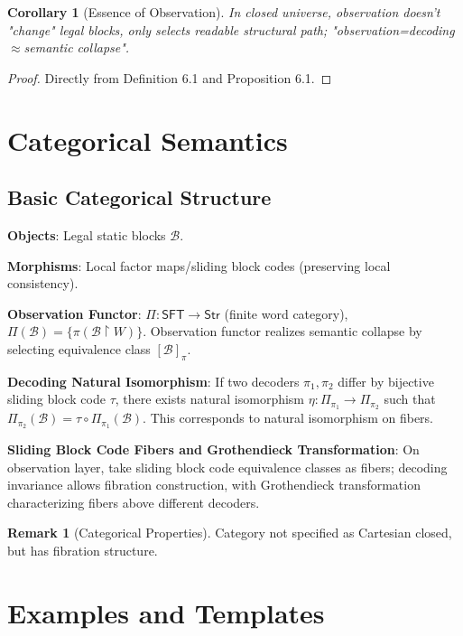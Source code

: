 \documentclass[12pt]{article}
\theoremstyle{plain}
\newtheorem{corollary}[theorem]{Corollary}
\theoremstyle{definition}
\newtheorem{remark}[theorem]{Remark}
\begin{document}
\begin{corollary}[Essence of Observation]
In closed universe, observation doesn't "change" legal blocks, only selects readable structural path; "observation=decoding$\approx$semantic collapse".
\end{corollary}

\begin{proof}
Directly from Definition 6.1 and Proposition 6.1.
\end{proof}

\section{Categorical Semantics}

\subsection{Basic Categorical Structure}

\textbf{Objects}: Legal static blocks $\mathcal{B}$.

\textbf{Morphisms}: Local factor maps/sliding block codes (preserving local consistency).

\textbf{Observation Functor}: $\Pi: \mathsf{SFT} \to \mathsf{Str}$ (finite word category), $\Pi(\mathcal{B}) = \{\pi(\mathcal{B} \upharpoonright W)\}$. Observation functor realizes semantic collapse by selecting equivalence class $[\mathcal{B}]_\pi$.

\textbf{Decoding Natural Isomorphism}: If two decoders $\pi_1, \pi_2$ differ by bijective sliding block code $\tau$, there exists natural isomorphism $\eta: \Pi_{\pi_1} \to \Pi_{\pi_2}$ such that $\Pi_{\pi_2}(\mathcal{B}) = \tau \circ \Pi_{\pi_1}(\mathcal{B})$. This corresponds to natural isomorphism on fibers.

\textbf{Sliding Block Code Fibers and Grothendieck Transformation}: On observation layer, take sliding block code equivalence classes as fibers; decoding invariance allows fibration construction, with Grothendieck transformation characterizing fibers above different decoders.

\begin{remark}[Categorical Properties]
Category not specified as Cartesian closed, but has fibration structure.
\end{remark}

\section{Examples and Templates}
\end{document}
